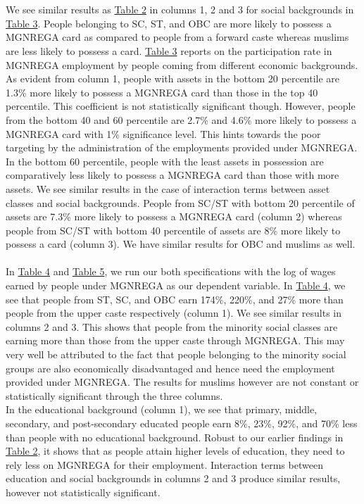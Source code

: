 \documentclass{article}
\begin{document}
\\
\\
We see similar results as \hyperref[tab2]{Table 2} in columns 1, 2 and 3 for social backgrounds in \hyperref[tab3]{Table 3}. People belonging to SC, ST, and OBC are more likely to possess a MGNREGA card as compared to people from a forward caste whereas muslims are less likely to possess a card. \hyperref[tab3]{Table 3} reports on the participation rate in MGNREGA employment by people coming from different economic backgrounds. As evident from column 1, people with assets in the bottom 20 percentile are 1.3\% more likely to possess a MGNREGA card than those in the top 40 percentile. This coefficient is not statistically significant though. However, people from the bottom 40 and 60 percentile are 2.7\% and 4.6\% more likely to possess a MGNREGA card with 1\% significance level. This hints towards the poor targeting by the administration of the employments provided under MGNREGA. In the bottom 60 percentile, people with the least assets in possession are comparatively less likely to possess a MGNREGA card than those with more assets. We see similar results in the case of interaction terms between asset classes and social backgrounds. People from SC/ST with bottom 20 percentile of assets are 7.3\% more likely to possess a MGNREGA card (column 2) whereas people from SC/ST with bottom 40 percentile of assets are 8\% more likely to possess a card (column 3). We have similar results for OBC and muslims as well.
\\
\\
In \hyperref[tab4]{Table 4} and \hyperref[tab5]{Table 5}, we run our both specifications with the log of wages earned by people under MGNREGA as our dependent variable. In \hyperref[tab4]{Table 4}, we see that people from ST, SC, and OBC earn 174\%, 220\%, and 27\% more than people from the upper caste respectively (column 1). We see similar results in columns 2 and 3. This shows that people from the minority social classes are earning more than those from the upper caste through MGNREGA. This may very well be attributed to the fact that people belonging to the minority social groups are also economically disadvantaged and hence need the employment provided under MGNREGA. The results for muslims however are not constant or statistically significant through the three columns.
\\
In the educational background (column 1), we see that primary, middle, secondary, and post-secondary educated people earn 8\%, 23\%, 92\%, and 70\% less than people with no educational background. Robust to our earlier findings in \hyperref[tab2]{Table 2}, it shows that as people attain higher levels of education, they need to rely less on MGNREGA for their employment. Interaction terms between education and social backgrounds in columns 2 and 3 produce similar results, however not statistically significant.
\end{document}

